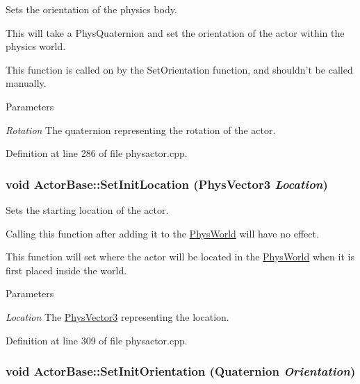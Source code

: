 Sets the orientation of the physics body. 

This will take a PhysQuaternion and set the orientation of the actor within the physics world. \par
 This function is called on by the SetOrientation function, and shouldn't be called manually. 
\begin{DoxyParams}{Parameters}
\item[{\em Rotation}]The quaternion representing the rotation of the actor. \end{DoxyParams}


Definition at line 286 of file physactor.cpp.

\hypertarget{classActorBase_ac118fc21f89d067d987d511b444f7d55}{
\subsubsection[{SetInitLocation}]{\setlength{\rightskip}{0pt plus 5cm}void ActorBase::SetInitLocation ({\bf PhysVector3} {\em Location})}}
\label{dd/d7b/classActorBase_ac118fc21f89d067d987d511b444f7d55}


Sets the starting location of the actor. 

Calling this function after adding it to the \hyperlink{classPhysWorld}{PhysWorld} will have no effect. \par
 This function will set where the actor will be located in the \hyperlink{classPhysWorld}{PhysWorld} when it is first placed inside the world. 
\begin{DoxyParams}{Parameters}
\item[{\em Location}]The \hyperlink{classPhysVector3}{PhysVector3} representing the location. \end{DoxyParams}


Definition at line 309 of file physactor.cpp.

\hypertarget{classActorBase_a968b3c8b29aac97b5240cf933783865b}{
\subsubsection[{SetInitOrientation}]{\setlength{\rightskip}{0pt plus 5cm}void ActorBase::SetInitOrientation ({\bf Quaternion} {\em Orientation})}}
\label{dd/d7b/classActorBase_a968b3c8b29aac97b5240cf933783865b}



